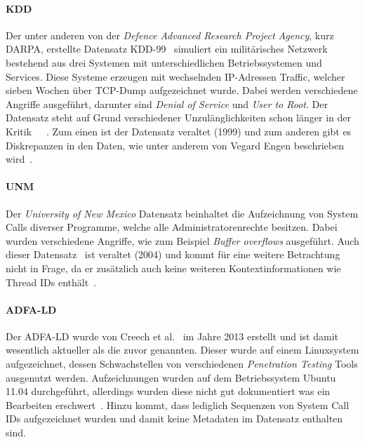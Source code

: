             \paragraph{KDD}
                Der unter anderen von der \textit{Defence Advanced Research Project Agency}, kurz DARPA, erstellte Datensatz KDD-99~\cite{DARPA}
                simuliert ein militärisches Netzwerk bestehend aus drei Systemen mit unterschiedlichen Betriebssystemen und Services. 
                Diese Systeme erzeugen mit wechselnden IP-Adressen Traffic, welcher sieben Wochen über TCP-Dump aufgezeichnet wurde.
                Dabei werden verschiedene Angriffe ausgeführt, darunter sind \textit{Denial of Service} und \textit{User to Root}.
                Der Datensatz steht auf Grund verschiedener Unzulänglichkeiten schon länger in der Kritik~\cite{KDD}~\cite{KDD2}~\cite{UNM}.
                Zum einen ist der Datensatz veraltet (1999) und zum anderen gibt es Diskrepanzen in den Daten, wie unter anderem von Vegard Engen beschrieben wird~\cite{KDD}.
            \paragraph{UNM}
                Der \textit{University of New Mexico} Datensatz beinhaltet die Aufzeichnung von System Calls diverser Programme, welche alle Administratorenrechte besitzen.
                Dabei wurden verschiedene Angriffe, wie zum Beispiel \textit{Buffer  overflows} ausgeführt.
                Auch dieser Datensatz~\cite{UNM} ist veraltet (2004) und kommt für eine weitere Betrachtung nicht in Frage,
                da er zusätzlich auch keine weiteren Kontextinformationen wie Thread IDs enthält~\cite{UNMcritic}.
            \paragraph{ADFA-LD}
                Der \ac{ADFA-LD} wurde von Creech et al.~\cite{UNMcritic} im Jahre 2013 erstellt und ist damit wesentlich aktueller als die zuvor genannten.
                Dieser wurde auf einem Linuxsystem aufgezeichnet, dessen Schwachstellen von verschiedenen \textit{Penetration Testing} Tools ausgenutzt werden.
                Aufzeichnungen wurden auf dem Betriebssystem Ubuntu 11.04 durchgeführt, allerdings wurden diese nicht gut dokumentiert was ein Bearbeiten erschwert~\cite{ADFA-LDcritic}.
                Hinzu kommt, dass lediglich Sequenzen von System Call IDs aufgezeichnet wurden und damit keine Metadaten im Datensatz enthalten sind.
